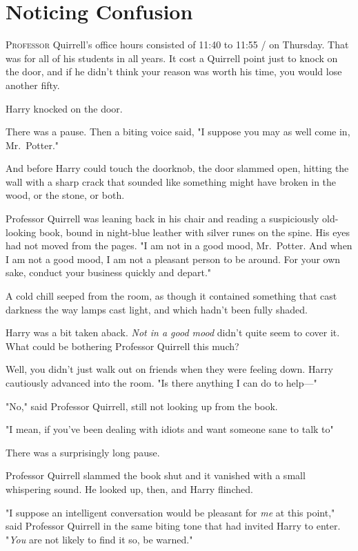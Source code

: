 \chapter{Noticing Confusion}

\lettrine{P}{rofessor} Quirrell's office hours consisted of 11:40 to 11:55 \AM/ on Thursday.
That was for all of his students in all years. It cost a Quirrell point just to
knock on the door, and if he didn't think your reason was worth his time, you
would lose another fifty.

Harry knocked on the door.

There was a pause. Then a biting voice said, "I suppose you may as well come
in, Mr.~Potter."

And before Harry could touch the doorknob, the door slammed open, hitting the
wall with a sharp crack that sounded like something might have broken in the
wood, or the stone, or both.

Professor Quirrell was leaning back in his chair and reading a suspiciously
old-looking book, bound in night-blue leather with silver runes on the spine.
His eyes had not moved from the pages. "I am not in a good mood, Mr.~Potter.
And when I am not a good mood, I am not a pleasant person to be around. For
your own sake, conduct your business quickly and depart."

A cold chill seeped from the room, as though it contained something that cast
darkness the way lamps cast light, and which hadn't been fully shaded.

Harry was a bit taken aback. \emph{Not in a good mood} didn't quite seem to
cover it. What could be bothering Professor Quirrell this much{\el}?

Well, you didn't just walk out on friends when they were feeling down. Harry
cautiously advanced into the room. "Is there anything I can do to help\mbox{---}"

"No," said Professor Quirrell, still not looking up from the book.

"I mean, if you've been dealing with idiots and want someone sane to talk
to{\el}"

There was a surprisingly long pause.

Professor Quirrell slammed the book shut and it vanished with a small
whispering sound. He looked up, then, and Harry flinched.

"I suppose an intelligent conversation would be pleasant for \emph{me} at this
point," said Professor Quirrell in the same biting tone that had invited Harry
to enter. "\emph{You} are not likely to find it so, be warned."

